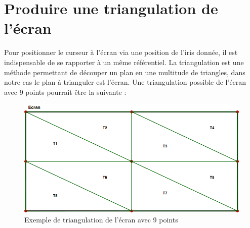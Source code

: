 \documentclass[a4paper, 12pt]{report}
\begin{document}
	\section{Produire une triangulation de l'écran}
	Pour positionner le curseur à l'écran via une position de l'iris donnée, il est indispensable de se rapporter à un même référentiel. La triangulation est une méthode permettant de découper un plan en une multitude de triangles, dans notre cas le plan à trianguler est l'écran. Une triangulation possible de l'écran avec 9 points pourrait être la suivante :
	\begin{figure}[!h]
		\includegraphics[scale=0.6]{triangulation_ecran.png}
		\caption{Exemple de triangulation de l'écran avec 9 points}	
	\end{figure}
	\newpage	  
\end{document}
